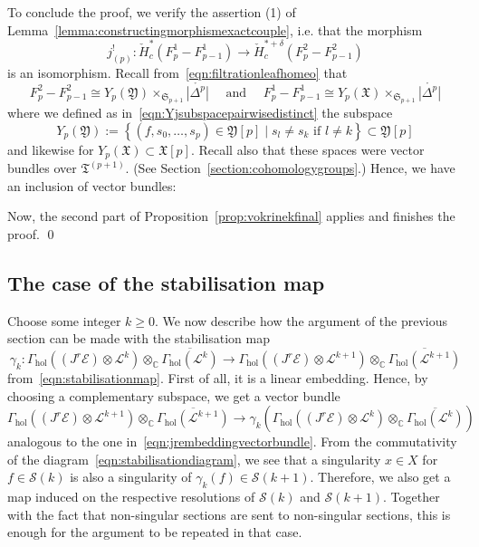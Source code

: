 \documentclass[a4paper]{amsart}
\newcommand{\bC}{\mathbb C}
\newcommand{\cE}{\mathcal E}
\newcommand{\cS}{\mathcal S}
\newcommand{\cL}{\mathcal L}
\newcommand{\fX}{\mathfrak X}
\newcommand{\fY}{\mathfrak Y}
\newcommand{\fT}{\mathfrak T}
\newcommand{\lra}{\longrightarrow}
\newcommand{\fS}{\mathfrak S}
\theoremstyle{plain}
\theoremstyle{definition}
\newcommand{\CCH}{\check{H}_{c}}
\newcommand{\Gammahol}{\Gamma_{\mathrm{hol}}}
\begin{document}
To conclude the proof, we verify the assertion (1) of Lemma~\ref{lemma:constructingmorphismexactcouple}, i.e. that the morphism
\[
    j^!_{(p)} \colon \CCH^*(F^1_p - F^1_{p-1}) \lra \CCH^{*+\delta}(F^2_p - F^2_{p-1})
\]
is an isomorphism. Recall from~\eqref{eqn:filtrationleafhomeo} that 
\[
    F^2_p - F^2_{p-1} \cong Y_p(\fY) \times_{\fS_{p+1}} \mathring{|\Delta^p|} \quad \text{ and } \quad F^1_p - F^1_{p-1} \cong Y_p(\fX) \times_{\fS_{p+1}} \mathring{|\Delta^p|}
\]
where we defined as in~\eqref{eqn:Yjsubspacepairwisedistinct} the subspace
\[
    Y_p(\fY) := \left\{ (f,s_0, \ldots, s_p) \in \fY[p] \mid s_l \neq s_k \text{ if } l \neq k \right\} \subset \fY[p]
\]
and likewise for $Y_p(\fX) \subset \fX[p]$. Recall also that these spaces were vector bundles over $\fT^{(p+1)}$. (See Section~\ref{section:cohomologygroups}.) Hence, we have an inclusion of vector bundles:
\begin{center}
\end{center}
Now, the second part of Proposition~\ref{prop:vokrinekfinal} applies and finishes the proof.
\qed

\subsection{The case of the stabilisation map}

Choose some integer $k \geq 0$. We now describe how the argument of the previous section can be made with the stabilisation map 
\[
    \gamma_k \colon \Gammahol\left( (J^r\cE) \otimes \cL^k \right) \otimes_\bC \overline{\Gammahol\left(\cL^k \right)} \lra \Gammahol\left( (J^r\cE) \otimes \cL^{k+1} \right) \otimes_\bC \overline{\Gammahol\left(\cL^{k+1} \right)}
\]
from~\eqref{eqn:stabilisationmap}. First of all, it is a linear embedding. Hence, by choosing a complementary subspace, we get a vector bundle
\[
    \Gammahol\left( (J^r\cE) \otimes \cL^{k+1} \right) \otimes_\bC \overline{\Gammahol\left(\cL^{k+1} \right)} \lra \gamma_k\left( \Gammahol\left( (J^r\cE) \otimes \cL^k \right) \otimes_\bC \overline{\Gammahol\left(\cL^k \right)} \right)
\]
analogous to the one in~\eqref{eqn:jrembeddingvectorbundle}. From the commutativity of the diagram~\eqref{eqn:stabilisationdiagram}, we see that a singularity $x \in X$ for $f \in \cS(k)$ is also a singularity of $\gamma_k(f) \in \cS(k+1)$. Therefore, we also get a map induced on the respective resolutions of $\cS(k)$ and $\cS(k+1)$. Together with the fact that non-singular sections are sent to non-singular sections, this is enough for the argument to be repeated in that case.
\end{document}
